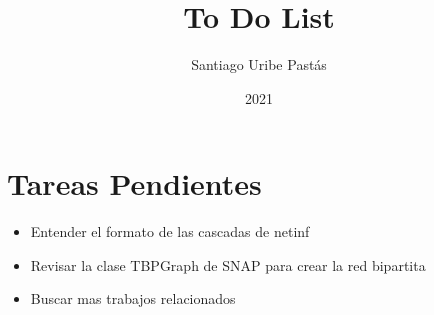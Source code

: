 \documentclass{article}
\title{To Do List}
\author{Santiago Uribe Pastás}
\date{2021}
\begin{document}
\maketitle

\section{Tareas Pendientes}
\begin{itemize}
    \item Entender el formato de las cascadas de netinf
    \item Revisar la clase TBPGraph de SNAP para crear la red bipartita
    \item Buscar mas trabajos relacionados
\end{itemize}
\end{document}
